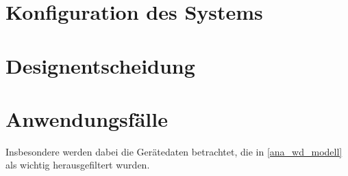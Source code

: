 \section{Konfiguration des Systems}
\label{ana_konfiguration}

\section{Designentscheidung}
\label{ana_entscheidungen}

\section{Anwendungsfälle}
\label{ana_uc}


Insbesondere werden dabei die Gerätedaten betrachtet, die in \ref{ana_wd_modell} als wichtig
herausgefiltert wurden.

